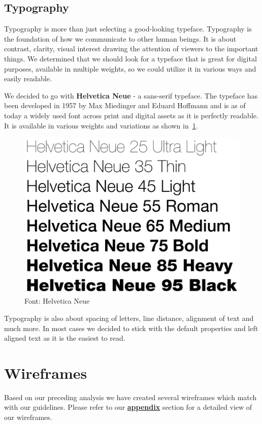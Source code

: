 \subsection{Typography}\label{subsec:typography}
Typography is more than just selecting a good-looking typeface.
Typography is the foundation of how we communicate to other human beings.
It is about contrast, clarity, visual interest drawing the attention of viewers to the important things.
We determined that we should look for a typeface that is great for digital purposes, available in multiple weights, so
we could utilize it in various ways and easily readable.

We decided to go with \textbf{Helvetica Neue} - a sans-serif typeface.
The typeface has been developed in 1957 by Max Miedinger and Eduard Hoffmann and is as of today a widely used font
across print and digital assets as it is perfectly readable.
It is available in various weights and variations as shown in~\ref{fig:figure4}.

\begin{figure}
    \centering
    \includegraphics[width=1.0\textwidth]{./images/helvetica-neue}
    \caption{Font: Helvetica Neue}
    \label{fig:figure4}
\end{figure}

Typography is also about spacing of letters, line distance, alignment of text and much more.
In most cases we decided to stick with the default properties and left aligned text as it is the easiest to read.

\section{Wireframes}\label{sec:wireframes}

Based on our preceding analysis we have created several wireframes which match with our guidelines.
Please refer to our \hyperref[ch:wireframes]{\textbf{appendix}} section for a detailed view of our wireframes.
